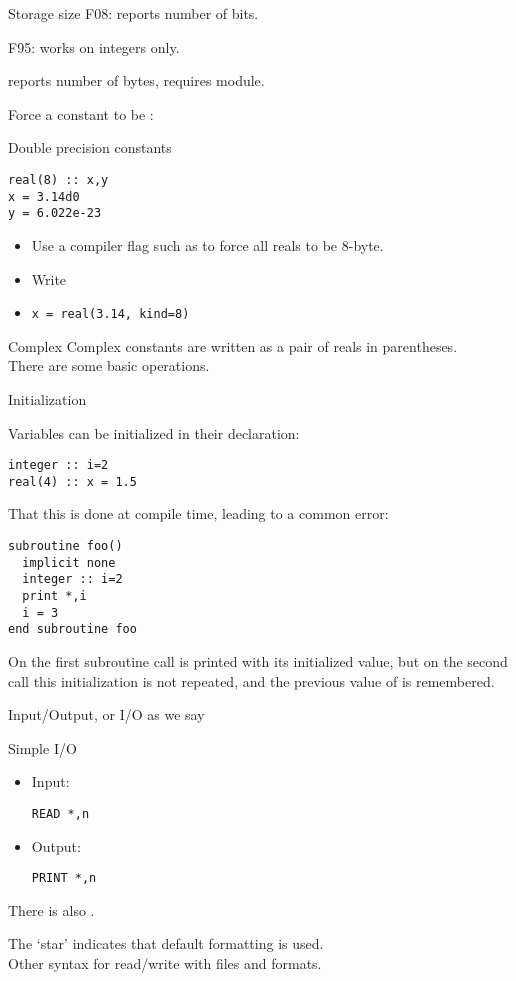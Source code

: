\begin{block}{Storage size}
  F08:  reports number of bits.

  F95:  works on integers only.

   reports number of bytes, requires
   module.
\end{block}

Force a constant to be :
\begin{block}{Double precision constants}
  \label{sl:fdouble}
\begin{lstlisting}
real(8) :: x,y
x = 3.14d0
y = 6.022e-23
\end{lstlisting}
  \begin{itemize}
  \item Use a compiler flag such as  to force all reals to be 8-byte.
  \item Write 
  \item \verb+x = real(3.14, kind=8)+
  \end{itemize}
\end{block}

\begin{block}{Complex}
  \label{sl:fcomplex}
  Complex constants are written as a pair of reals in parentheses.\\
  There are some basic operations.
\end{block}

 {Initialization}

Variables can be initialized in their declaration:
\begin{lstlisting}
integer :: i=2
real(4) :: x = 1.5
\end{lstlisting}

That this is done at compile time, leading to a common error:
\begin{lstlisting}
subroutine foo()
  implicit none
  integer :: i=2
  print *,i
  i = 3
end subroutine foo
\end{lstlisting}
On the first subroutine call  is printed with its initialized
value, but on the second call this initialization is not repeated, and
the previous value of  is remembered.

 {Input/Output, or I/O as we say}
\label{sec:fio}

\begin{block}{Simple I/O}
  \label{sl:frw}
  \begin{itemize}
  \item Input: 
\begin{lstlisting}
READ *,n
\end{lstlisting}
\item Output:
\begin{lstlisting}
PRINT *,n
\end{lstlisting}
  \end{itemize}
  There is also .

  The `star' indicates that default formatting is used.\\
  Other syntax for read/write with files and formats.
\end{block}

